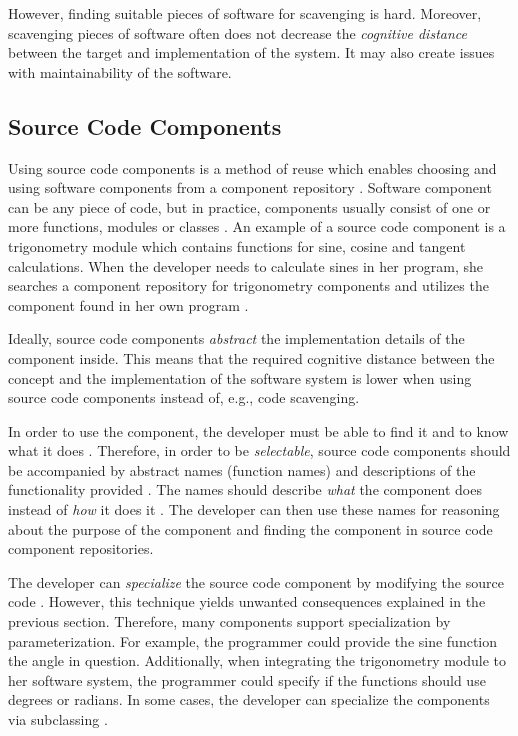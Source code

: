 However, finding suitable pieces of software for scavenging is hard. Moreover, scavenging pieces of software often does not decrease the \emph{cognitive distance} between the target and implementation of the system. It may also create issues with maintainability of the software. \citep[chap.~4]{krueger_software_1992}

\subsection{Source Code Components}

Using source code components is a method of reuse which enables choosing and using software components from a component repository \citep[chap.~3]{sametinger_software_1997}. Software component can be any piece of code, but in practice, components usually consist of one or more functions, modules or classes \citep[chap.~3]{sametinger_software_1997}. An example of a source code component is a trigonometry module which contains functions for sine, cosine and tangent calculations. When the developer needs to calculate sines in her program, she searches a component repository for trigonometry components and utilizes the component found in her own program \citep[chap.~5]{krueger_software_1992}.

Ideally, source code components \emph{abstract} the implementation details of the component inside. This means that the required cognitive distance between the concept and the implementation of the software system is lower when using source code components instead of, e.g., code scavenging. 

In order to use the component, the developer must be able to find it and to know what it does \citep[chap.~5]{krueger_software_1992}. Therefore, in order to be \emph{selectable}, source code components should be accompanied by abstract names (function names) and descriptions of the functionality provided \citep[chap.~5]{krueger_software_1992}. The names should describe \emph{what} the component does instead of \emph{how} it does it \citep[chap.~5]{krueger_software_1992}. The developer can then use these names for reasoning about the purpose of the component and finding the component in source code component repositories.

The developer can \emph{specialize} the source code component by modifying the source code \citep[chap.~5]{krueger_software_1992}. However, this technique yields unwanted consequences explained in the previous section. Therefore, many components support specialization by parameterization. For example, the programmer could provide the sine function the angle in question. Additionally, when integrating the trigonometry module to her software system, the programmer could specify if the functions should use degrees or radians. In some cases, the developer can specialize the components via subclassing \citep[chap.~5]{krueger_software_1992}.

